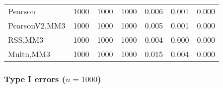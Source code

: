 \documentclass[
]{article}
\begin{document}
\begin{table}[H]
{\begin{tabular}[t]{lrrrrrr}
\hspace{1em}Pearson & 1000 & 1000 & 1000 & 0.006 & 0.001 & 0.000\\
\hspace{1em}PearsonV2,MM3 & 1000 & 1000 & 1000 & 0.005 & 0.001 & 0.000\\
\hspace{1em}RSS,MM3 & 1000 & 1000 & 1000 & 0.004 & 0.000 & 0.000\\
\hspace{1em}Multn,MM3 & 1000 & 1000 & 1000 & 0.015 & 0.004 & 0.000\\
\bottomrule
\end{tabular}}
\end{table}

\hypertarget{type-i-errors-n1000-3}{%
\subsubsection{\texorpdfstring{Type I errors
(\(n=1000\))}{Type I errors (n=1000)}}\label{type-i-errors-n1000-3}}
\end{document}
